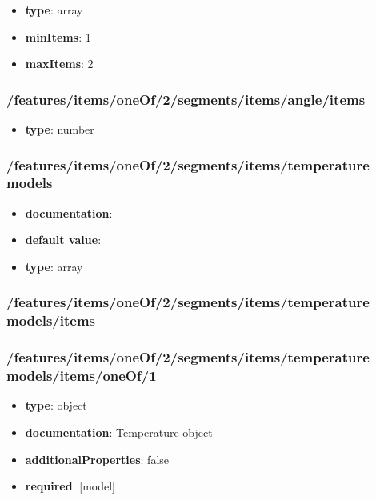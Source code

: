 \begin{itemize}\item {\bf type}: array
\item {\bf minItems}: 1
\item {\bf maxItems}: 2
\end{itemize}\subsubsection{/features/items/oneOf/2/segments/items/angle/items}
\begin{itemize}\item {\bf type}: number
\end{itemize}\subsubsection{/features/items/oneOf/2/segments/items/temperature models}
\begin{itemize}\item {\bf documentation}: 
\item {\bf default value}: 
\item {\bf type}: array
\end{itemize}\subsubsection{/features/items/oneOf/2/segments/items/temperature models/items}

\subsubsection{/features/items/oneOf/2/segments/items/temperature models/items/oneOf/1}
\begin{itemize}\item {\bf type}: object
\item {\bf documentation}: Temperature object
\item {\bf additionalProperties}: false
\item {\bf required}: [model]\end{itemize}
